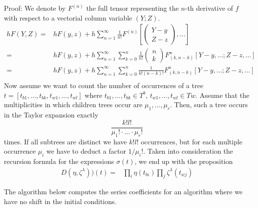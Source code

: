 \documentclass[english,unicode]{article}
\begin{document}
Proof:
We denote by $F^{(n)}$ the full tensor representing the $n$-th derivative of $f$ with respect to a vectorial column variable $(Y;Z)$. 
\begin{align*}
hF(Y,Z)=&hF(y,z)+h\sum_{n=1}^{\infty} \frac{1}{n!} F^{(n)}\left[\begin{pmatrix} Y-y \\ Z-z \end{pmatrix},\dots \right]\\
=&hF(y,z)+h\sum_{n=1}^{\infty} \sum_{k=0}^n   \frac{1}{n!} \begin{pmatrix} n\\ k \end{pmatrix}   F^n_{(k,n-k)}\left[Y-y, \dots;  Z-z, \dots \right]\\
=&hF(y,z)+h\sum_{n=1}^{\infty} \sum_{k=0}^n   \frac{1}{k! (n-k)!}   F^n_{(k,n-k)}\left[Y-y, \dots;  Z-z, \dots \right]\\
\end{align*}
Now assume we want to count the number of occurrences of a tree $t=[t_{b1},\dots, t_{bk}, t_{w1},\dots, t_{wl}]$ where $t_{b1},\dots, t_{bk} \in T^b$, $t_{w1},\dots, t_{wl}\in Tw$.
Assume that the multiplicities in which children trees occur  are $\mu_1,\dots, \mu_r$. Then, such a tree occurs in the Taylor expansion exactly
\[ \frac{k! l!}{\mu_1!\cdot \dots\cdot \mu_r!} \]
times. If all subtrees are distinct we have $k! l!$ occurrences, but for each multiple occurrence $\mu_i$ we have to deduct a factor $1/\mu_i!$.
Taken into consideration the recursion formula for the expressions $\sigma(t)$, we end up with the proposition
\begin{align}
D(\eta, \zeta^{\lambda}))(t)=&\prod_i \eta(t_{bi}) \prod_j \zeta^{\lambda}(t_{wj})
\end{align}





The algorithm below computes the series coefficients for an algorithm where we have no shift in the initial conditions.
\end{document}
